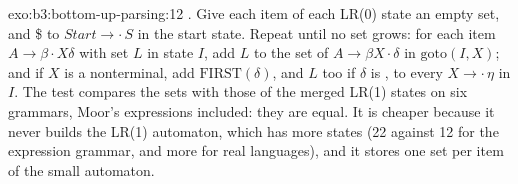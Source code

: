 \begin{solution}{exo:b3:bottom-up-parsing:12}
. Give each item of each LR(0) state an empty set, and \$ to $\mathit{Start} \to \cdot\,S$ in the start state. Repeat until no set grows: for each item $A \to \beta \cdot X \delta$ with set $L$ in state $I$, add $L$ to the set of $A \to \beta X \cdot \delta$ in $\mathrm{goto}(I, X)$; and if $X$ is a nonterminal, add $\mathrm{FIRST}(\delta)$, and $L$ too if $\delta$ is , to every $X \to \cdot\,\eta$ in $I$. The test compares the sets with those of the merged LR(1) states on six grammars, Moor's expressions included: they are equal. It is cheaper because it never builds the LR(1) automaton, which has more states (22 against 12 for the expression grammar, and more for real languages), and it stores one set per item of the small automaton.
\end{solution}

